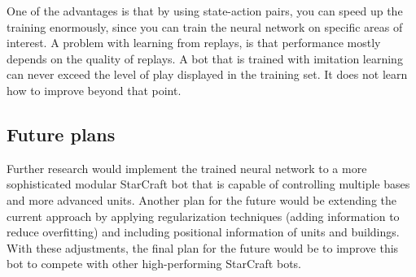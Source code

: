 One of the advantages is that by using state-action pairs, you can speed up the training enormously, since you can train the neural network on specific areas of interest. A problem with learning from replays, is that performance mostly depends on the quality of replays. A bot that is trained with imitation learning can never exceed the level of play displayed in the training set. It does not learn how to improve beyond that point.

\subsection{Future plans}

Further research would implement the trained neural network to a more sophisticated modular StarCraft bot that is capable of controlling multiple bases and more advanced units. Another plan for the future would be extending the current approach by applying regularization techniques (adding information to reduce overfitting) and including positional information of units and buildings. With these adjustments, the final plan for the future would be to improve this bot to compete with other high-performing StarCraft bots. 